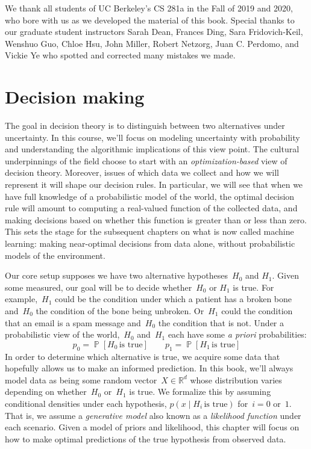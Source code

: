 \documentclass{tufte-book}
\begin{document}
We thank all students of UC Berkeley's CS 281a in the Fall of 2019 and
2020, who bore with us as we developed the material of this book.
Special thanks to our graduate student instructors Sarah Dean, Frances
Ding, Sara Fridovich-Keil, Wenshuo Guo, Chloe Hsu, John Miller, Robert
Netzorg, Juan C. Perdomo, and Vickie Ye who spotted and corrected many
mistakes we made.

\chapter{Decision making}

The goal in decision theory is to distinguish between two alternatives
under uncertainty. In this course, we'll focus on modeling uncertainty
with probability and understanding the algorithmic implications of this
view point. The cultural underpinnings of the field choose to start with
an \emph{optimization-based} view of decision theory. Moreover, issues
of which data we collect and how we will represent it will shape our
decision rules. In particular, we will see that when we have full
knowledge of a probabilistic model of the world, the optimal decision
rule will amount to computing a real-valued function of the collected
data, and making decisions based on whether this function is greater
than or less than zero. This sets the stage for the subsequent chapters
on what is now called machine learning: making near-optimal decisions
from data alone, without probabilistic models of the environment.

Our core setup supposes we have two alternative hypotheses~\(H_0\) and
\(H_1\). Given some measured, our goal will be to decide whether~\(H_0\)
or \(H_1\) is true. For example,~\(H_1\) could be the condition under
which a patient has a broken bone and~\(H_0\) the condition of the bone
being unbroken. Or~\(H_1\) could the condition that an email is a spam
message and~\(H_0\) the condition that is not. Under a probabilistic
view of the world,~\(H_0\) and~\(H_1\) each have some \emph{a priori}
probabilities: \[
p_0 = \mathop\mathbb{P}[H_0\,\text{is true}]
\qquad p_1 = \mathop\mathbb{P}[H_1\,\text{is true}]
\] In order to determine which alternative is true, we acquire some data
that hopefully allows us to make an informed prediction. In this book,
we'll always model data as being some random
vector~\(X \in \mathbb{R}^d\) whose distribution varies depending on
whether~\(H_0\) or~\(H_1\) is true. We formalize this by assuming
conditional densities under each hypothesis,
\(p(x \mid H_i\,\text{is true})\) for~\(i=0\) or~\(1\). That is, we
assume a \emph{generative model} also known as a \emph{likelihood
function} under each scenario. Given a model
of priors and likelihood, this chapter will focus on how to make optimal
predictions of the true hypothesis from observed data.
\end{document}
